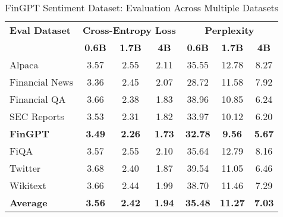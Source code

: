 
\begin{table}[htbp]
\centering
\caption[FinGPT Sentiment: Evaluation Results]{FinGPT Sentiment Dataset: Evaluation Across Multiple Datasets}
\label{tab:fingpt_results}
\begin{tabular}{l|ccc|ccc}
\hline
\textbf{Eval Dataset} & \multicolumn{3}{c|}{\textbf{Cross-Entropy Loss}} & \multicolumn{3}{c}{\textbf{Perplexity}} \\
\cline{2-4} \cline{5-7}
  & \textbf{0.6B} & \textbf{1.7B} & \textbf{4B} & \textbf{0.6B} & \textbf{1.7B} & \textbf{4B} \\
Alpaca & 3.57 & 2.55 & 2.11 & 35.55 & 12.78 & 8.27 \\
Financial News & 3.36 & 2.45 & 2.07 & 28.72 & 11.58 & 7.92 \\
Financial QA & 3.66 & 2.38 & 1.83 & 38.96 & 10.85 & 6.24 \\
SEC Reports & 3.53 & 2.31 & 1.82 & 33.97 & 10.12 & 6.20 \\
\textbf{FinGPT} & \textbf{3.49} & \textbf{2.26} & \textbf{1.73} & \textbf{32.78} & \textbf{9.56} & \textbf{5.67} \\
FiQA & 3.57 & 2.55 & 2.10 & 35.64 & 12.79 & 8.16 \\
Twitter & 3.68 & 2.40 & 1.87 & 39.54 & 11.05 & 6.46 \\
Wikitext & 3.66 & 2.44 & 1.99 & 38.70 & 11.46 & 7.29 \\
\hline
\textbf{Average} & \textbf{3.56} & \textbf{2.42} & \textbf{1.94} & \textbf{35.48} & \textbf{11.27} & \textbf{7.03} \\
\hline
\end{tabular}
\end{table}
